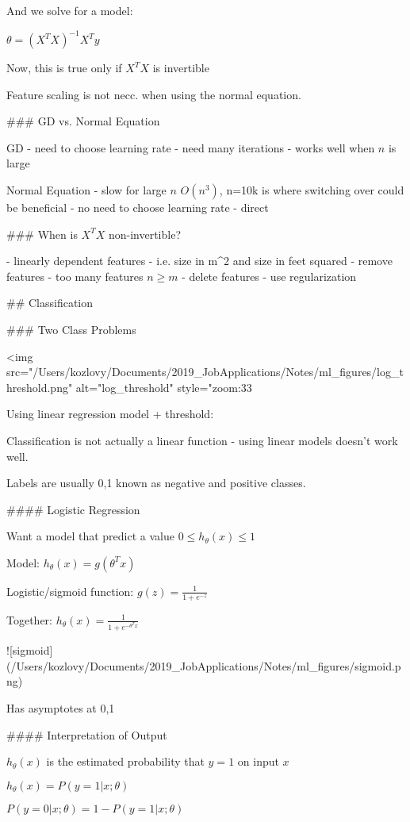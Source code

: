 And we solve for a model:

$\theta = (X^T X)^{-1} X^T y$



Now, this is true only if $X^T X$ is invertible

Feature scaling is not necc. when using the normal equation.

### GD vs. Normal Equation

GD
- need to choose learning rate
- need many iterations
- works well when $n$ is large

Normal Equation 
- slow for large $n$  $O(n^3)$, n=10k is where switching over could be beneficial
- no need to choose learning rate
- direct

### When is $X^TX$ non-invertible? 

- linearly dependent features - i.e. size in m^2 and size in feet squared
  - remove features
- too many features $n\ge m$ 
  - delete features 
  - use regularization

## Classification

### Two Class Problems

<img src="/Users/kozlovy/Documents/2019_JobApplications/Notes/ml_figures/log_threshold.png" alt="log_threshold" style="zoom:33%

Using linear regression model + threshold:

Classification is not actually a linear function - using linear models doesn't work well.

Labels are usually {0,1} known as negative and positive classes.

#### Logistic Regression

Want a model that predict a value $0\le h_\theta(x)\le 1$

Model: $h_\theta(x)=g(\theta^T x)$ 

Logistic/sigmoid function: $g(z) = \frac{1}{1+e^{-z}}$

Together: $h_\theta(x)=\frac{1}{1+e^{-\theta^T x}}$

![sigmoid](/Users/kozlovy/Documents/2019_JobApplications/Notes/ml_figures/sigmoid.png)

Has  asymptotes at {0,1}

#### Interpretation of Output

$h_\theta(x)$ is the estimated probability that  $y=1$ on input $x$ 

$h_\theta(x) = P(y=1|x;\theta)$ 

$P(y=0|x;\theta) = 1-P(y=1|x;\theta)$

